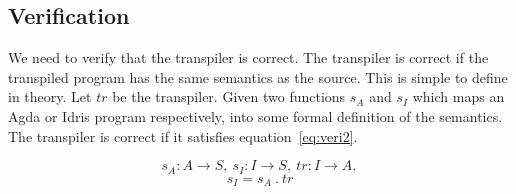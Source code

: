 \subsection{Verification}\label{sec:veri}

We need to verify that the transpiler is correct. The transpiler is correct if
the transpiled program has the same semantics as the source.
This is simple to define in theory.
Let $tr$ be the transpiler.
Given two functions $s_A$ and $s_I$ which maps an Agda or Idris program
respectively, into some formal definition of the semantics.
The transpiler is correct if it satisfies equation~\ref{eq:veri2}.

\begin{equation} \label{eq:veri1}
  s_A : A \rightarrow S,
  \ s_I : I \rightarrow S,
  \ tr : I \rightarrow A,
\end{equation}
\begin{equation} \label{eq:veri2}
  s_I = s_A\ .\ tr
\end{equation}


